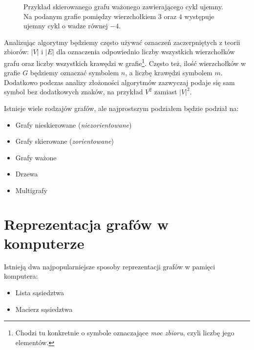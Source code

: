 \documentclass[12pt,a4paper]{book}
\theoremstyle{definition}
\numberwithin{equation}{chapter}
\begin{document}
\begin{figure}[H]
\centering
{}
\caption{Przykład skierowanego grafu ważonego zawierającego cykl ujemny.
Na podanym grafie pomiędzy wierzchołkiem $3$ oraz $4$ występuje ujemny cykl o wadze równej $-4$.}
\label{rys_ujemny_cykl}
\end{figure}

Analizując algorytmy będziemy często używać oznaczeń zaczerpniętych z teorii zbiorów: $|V|$ i $|E|$ dla oznaczenia odpowiednio liczby wszystkich wierzchołków grafu oraz liczby wszystkich krawędzi w grafie\footnote{Chodzi tu konkretnie o symbole oznaczające \textit{moc zbioru}, czyli liczbę jego elementów.}. Często też, ilość wierzchołków w grafie $G$ będziemy oznaczać symbolem $n$, a liczbę krawędzi symbolem $m$. Dodatkowo podczas analizy złożoności algorytmów zazwyczaj podaje się sam symbol bez dodatkowych znaków, na przykład $V^2$ zamiast $|V|^2$.

Istnieje wiele rodzajów grafów, ale najprostszym podziałem będzie podział na:
\begin{itemize}
\item Grafy nieskierowane (\textit{niezorientowane})
\item Grafy skierowane (\textit{zorientowane})
\item Grafy ważone
\item Drzewa
\item Multigrafy
\end{itemize}

\section{Reprezentacja grafów w komputerze}

Istnieją dwa najpopularniejsze sposoby reprezentacji grafów w pamięci komputera:
\begin{itemize}
\item Lista sąsiedztwa
\item Macierz sąsiedztwa
\end{itemize}
\end{document}
